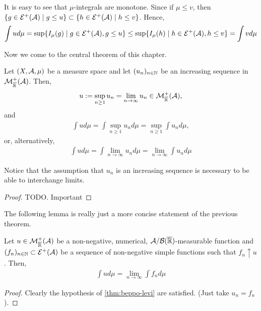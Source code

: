 \begin{remark}
	\label{rem:mu-integrals-monotone}
	It is easy to see that $\mu$-integrals are monotone. Since if $\mu \leq v$, then $\{g \in \mathcal{E}^+(\mathcal{A}) \mid g \leq u\} \subset \{h \in \mathcal{E}^+(\mathcal{A}) \mid h \leq v\}$. Hence,
	\begin{align*}
		\int u d\mu = \sup \{I_\mu(g) \mid g \in \mathcal{E}^+(\mathcal{A}), g \leq u\} \leq \sup \{I_\mu(h) \mid h \in \mathcal{E}^+(\mathcal{A}), h \leq v\} = \int v d\mu
	\end{align*}
\end{remark}

Now we come to the central theorem of this chapter.

\begin{thm}
	\label{thm:beppo-levi}
	Let $(X, \mathcal{A}, \mu)$ be a measure space and let $(u_n)_{n\in\mathbb{N}}$ be an increasing sequence in $\mathcal{M}^+_{\overline{\mathbb{R}}}(\mathcal{A})$. Then,
	\begin{align*}
		u := \sup_{n \geq 1} u_n = \lim_{n \to \infty} u_n \in \mathcal{M}_{\overline{\mathbb{R}}}^+(\mathcal{A}),
	\end{align*}
	and
	\begin{align}
		\int u d\mu = \int \sup_{n \geq 1} u_n d\mu = \sup_{n \geq 1} \int u_n d\mu,
	\end{align}
	or, alternatively,
	\begin{align}
		\int u d\mu = \int \lim_{n \to \infty} u_n d\mu = \lim_{n \to \infty} \int u_n d\mu
	\end{align}
\end{thm}

Notice that the assumption that $u_n$ is an increasing sequence is necessary to be able to interchange limits.

\begin{proof}
	TODO. Important
\end{proof}

The following lemma is really just a more concise statement of the previous theorem.
\begin{cor}
	\label{cor:beppo-levi}
	Let $u \in \mathcal{M}_{\overline{\mathbb{R}}}^+(\mathcal{A})$ be a non-negative, numerical, $\mathcal{A}/\mathcal{B}({\overline{\mathbb{R}}})$-measurable function and $(f_n)_{n\in\mathbb{N}} \subset \mathcal{E}^+(\mathcal{A})$ be a sequence of non-negative simple functions such that $f_n \uparrow u$. Then,
	\begin{align}
		\int u d\mu = \lim_{n \to \infty} \int f_n d\mu
	\end{align}
\end{cor}

\begin{proof}
	Clearly the hypothesis of \autoref{thm:beppo-levi} are satisfied. (Just take $u_n = f_n$).
\end{proof}

